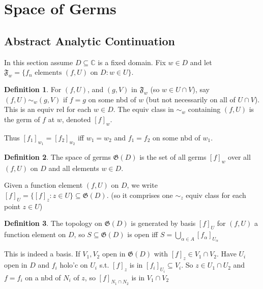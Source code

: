 \documentclass{article}
\theoremstyle{definition}
\newtheorem{defn}{Definition}[section]
\theoremstyle{remark}
\theoremstyle{plain}
\newcommand{\CC}{\mathbb{C}}
\begin{document}
\section{Space of Germs}
\subsection{Abstract Analytic Continuation}
In this section assume $D\subseteq\CC$ is a fixed domain. Fix $w\in D$ and let $\mathfrak F_w=\{f_n\text{ elements } (f,U)\text{ on }D: w\in U\}$.
\begin{defn}
    For $(f,U)$, and $(g,V)$ in $\mathfrak F_w$ (so $w\in U\cap V$), say $(f,U)\sim_w(g,V)$ if $f=g$ on some nbd of $w$ (but not necessarily on all of $U\cap V$). This is an equiv rel for each $w\in D$. The equiv class in $\sim_w$ containing $(f,U)$ is the germ of $f$ at $w$, denoted $[f]_w$.
\end{defn}
Thus $[f_1]_{w_1}=[f_2]_{w_2}$ iff $w_1=w_2$ and $f_1=f_2$ on some nbd of $w_1$.
\begin{defn}
    The space of germs $\mathfrak G(D)$ is the set of all germs $[f]_w$ over all $(f,U)$ on $D$ and all elements $w\in D$.
\end{defn}
Given a function element $(f,U)$ on $D$, we write $[f]_U=\{[f]_z:z\in U\}\subseteq\mathfrak G(D)$. (so it comprises one $\sim_z$ equiv class for each point $z\in U$)
\begin{defn}
    The topology on $\mathfrak G(D)$ is generated by basis $[f]_U$ for $(f,U)$ a function element on $D$, so $S\subseteq\mathfrak G(D)$ is open iff $S=\bigcup_{\alpha\in A}[f_\alpha]_{U_\alpha}$
\end{defn}
This is indeed a basis. If $V_1,V_2$ open in $\mathfrak G(D)$ with $[f]_z\in V_1\cap V_2$. Have $U_i$ open in $D$ and $f_i$ holo'c on $U_i$ s.t. $[f]_z$ is in $[f_i]_{U_i}\subseteq V_i$. So $z\in U_1\cap U_2$ and $f=f_i$ on a nbd of $N_i$ of $z$, so $[f]_{N_1\cap N_2}$ is in $V_1\cap V_2$
\end{document}
